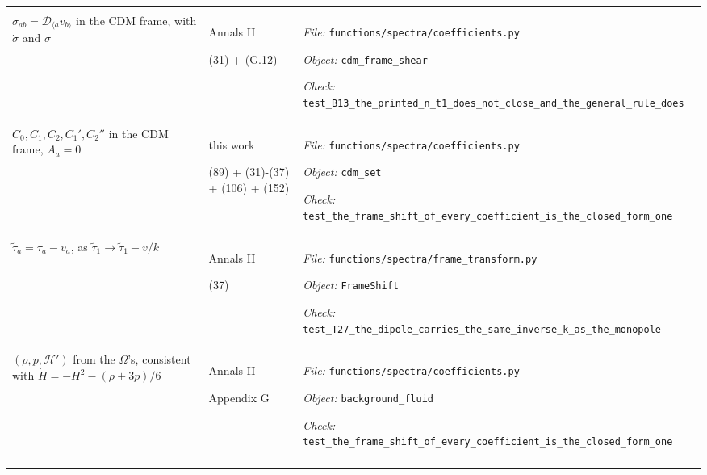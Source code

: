 \begin{landscape}
\begin{longtable}{@{}>{\raggedright\arraybackslash}p{80mm}
                     >{\raggedright\arraybackslash}p{38mm}
                     >{\raggedright\arraybackslash}p{99mm}@{}}
{\textit{Object:} \nolinkurl{c2_derivatives}\par
\textit{Check:} \nolinkurl{test_no_numerical_derivative_survives_in_the_c2_chain}} \\
\addlinespace[2pt]
$\sigma_{ab}=\mathcal{D}_{\langle a}v_{b\rangle}$ in the CDM frame, with $\dot\sigma$ and $\ddot\sigma$ & Annals II\par (31) + (G.12) & {\scriptsize \textit{File:} \nolinkurl{functions/spectra/coefficients.py}\par
\textit{Object:} \nolinkurl{cdm_frame_shear}\par
\textit{Check:} \nolinkurl{test_B13_the_printed_n_t1_does_not_close_and_the_general_rule_does}} \\
\addlinespace[2pt]
$C_0,C_1,C_2,C_1',C_2''$ in the CDM frame, $A_a=0$ & this work\par (89) + (31)-(37) + (106) + (152) & {\scriptsize \textit{File:} \nolinkurl{functions/spectra/coefficients.py}\par
\textit{Object:} \nolinkurl{cdm_set}\par
\textit{Check:} \nolinkurl{test_the_frame_shift_of_every_coefficient_is_the_closed_form_one}} \\
\addlinespace[2pt]
$\tilde\tau_a=\tau_a-v_a$, as $\tilde\tau_1\to\tilde\tau_1-v/k$ & Annals II\par (37) & {\scriptsize \textit{File:} \nolinkurl{functions/spectra/frame_transform.py}\par
\textit{Object:} \nolinkurl{FrameShift}\par
\textit{Check:} \nolinkurl{test_T27_the_dipole_carries_the_same_inverse_k_as_the_monopole}} \\
\addlinespace[2pt]
$(\rho,p,\mathcal{H}')$ from the $\Omega$'s, consistent with $\dot H=-H^2-(\rho+3p)/6$ & Annals II\par Appendix G & {\scriptsize \textit{File:} \nolinkurl{functions/spectra/coefficients.py}\par
\textit{Object:} \nolinkurl{background_fluid}\par
\textit{Check:} \nolinkurl{test_the_frame_shift_of_every_coefficient_is_the_closed_form_one}} \\
\addlinespace[2pt]
\end{longtable}
\endgroup
\end{landscape}
